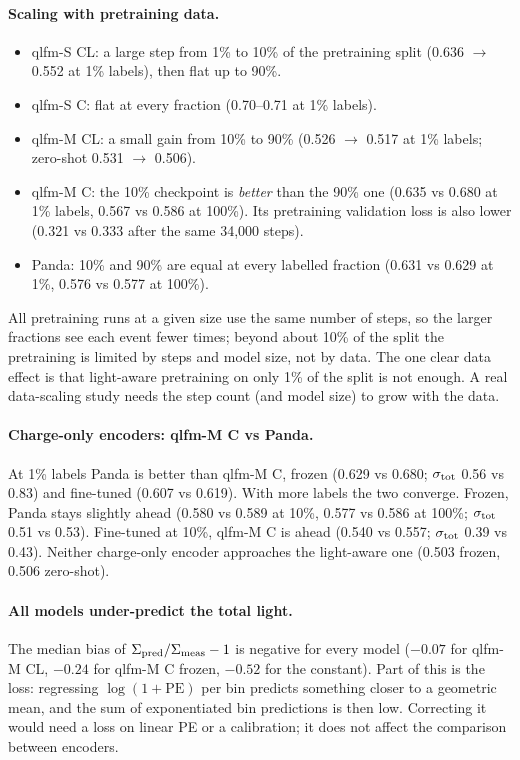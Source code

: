 \paragraph{Scaling with pretraining data.}
\begin{itemize}
  \item qlfm-S CL: a large step from 1\% to 10\% of the pretraining split (0.636 $\to$ 0.552 at 1\% labels), then flat up to 90\%.
  \item qlfm-S C: flat at every fraction (0.70--0.71 at 1\% labels).
  \item qlfm-M CL: a small gain from 10\% to 90\% (0.526 $\to$ 0.517 at 1\% labels; zero-shot 0.531 $\to$ 0.506).
  \item qlfm-M C: the 10\% checkpoint is \emph{better} than the 90\% one (0.635 vs 0.680 at 1\% labels, 0.567 vs 0.586 at 100\%). Its pretraining validation loss is also lower (0.321 vs 0.333 after the same 34{,}000 steps).
  \item Panda: 10\% and 90\% are equal at every labelled fraction (0.631 vs 0.629 at 1\%, 0.576 vs 0.577 at 100\%).
\end{itemize}
All pretraining runs at a given size use the same number of steps, so the larger fractions see each event fewer times; beyond about 10\% of the split the pretraining is limited by steps and model size, not by data. The one clear data effect is that light-aware pretraining on only 1\% of the split is not enough. A real data-scaling study needs the step count (and model size) to grow with the data.

\paragraph{Charge-only encoders: qlfm-M C vs Panda.} At 1\% labels Panda is better than qlfm-M C, frozen (0.629 vs 0.680; $\sigma_{\rm tot}$ 0.56 vs 0.83) and fine-tuned (0.607 vs 0.619). With more labels the two converge. Frozen, Panda stays slightly ahead (0.580 vs 0.589 at 10\%, 0.577 vs 0.586 at 100\%; $\sigma_{\rm tot}$ 0.51 vs 0.53). Fine-tuned at 10\%, qlfm-M C is ahead (0.540 vs 0.557; $\sigma_{\rm tot}$ 0.39 vs 0.43). Neither charge-only encoder approaches the light-aware one (0.503 frozen, 0.506 zero-shot).

\paragraph{All models under-predict the total light.} The median bias of $\Sigma_{\rm pred}/\Sigma_{\rm meas}-1$ is negative for every model ($-0.07$ for qlfm-M CL, $-0.24$ for qlfm-M C frozen, $-0.52$ for the constant). Part of this is the loss: regressing $\log(1+\text{PE})$ per bin predicts something closer to a geometric mean, and the sum of exponentiated bin predictions is then low. Correcting it would need a loss on linear PE or a calibration; it does not affect the comparison between encoders.

